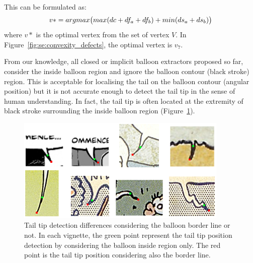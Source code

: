 This can be formulated as:
\begin{equation}\label{eq:se:optimisation}
   v* = argmax\big( max(dc+df_a+df_b) + min(ds_a + ds_b) \big)\\
 \end{equation}
 where $v*$ is the optimal vertex from the set of vertex $V$.
In Figure~\ref{fig:se:convexity_defects}, the optimal vertex is $v_7$.


From our knowledge, all closed or implicit balloon extractors proposed so far, consider the inside balloon region and ignore the balloon contour (black stroke) region.
This is acceptable for localising the tail on the balloon contour (angular position) but it is not accurate enough to detect the tail tip in the sense of human understanding.
In fact, the tail tip is often located at the extremity of black stroke surrounding the inside balloon region (Figure~\ref{fig:se:tail_examples}).


    \begin{figure}[ht]%
      \centering
      \includegraphics[width=0.9\textwidth]{tail_examples.png}
    \caption[Tail tip position precise position]{Tail tip detection differences considering the balloon border line or not. In each vignette, the green point represent the tail tip position detection by considering the balloon inside region only.
    The red point is the tail tip position considering also the border line.}
    \label{fig:se:tail_examples}
    \end{figure}

